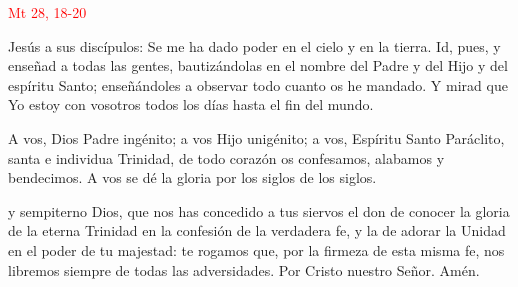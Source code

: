 \documentclass[10pt]{article}
\begin{document}
\begin{multicols}{2}
      \vspace{2mm}

      \hfill\textcolor{red}{Mt 28, 18-20}

      Jesús a sus discípulos: Se me ha dado poder en el cielo y en la tierra. Id, pues, y enseñad a todas las gentes, bautizándolas en el nombre del Padre y del Hijo y del espíritu
      Santo; enseñándoles a observar todo cuanto os he mandado. Y mirad que Yo estoy con vosotros todos los días hasta el fin del mundo.

      \vspace{2mm}

      \begin{otherlanguage}{latin}
            

            \vspace{1mm}

            

            \vspace{1mm}

            
      \end{otherlanguage}

      \vspace{2mm}

      A vos, Dios Padre ingénito; a vos Hijo unigénito; a vos, Espíritu Santo Paráclito, santa e individua Trinidad, de todo corazón os confesamos, alabamos y bendecimos. A vos se dé
      la gloria por los siglos de los siglos.

      \vspace{2mm}


      \vspace{2mm}

      y sempiterno Dios, que nos has concedido a tus siervos el don de conocer la gloria de la eterna Trinidad en la confesión de la verdadera fe,
      y la de adorar la Unidad en el poder de tu majestad: te rogamos que, por la firmeza de esta misma fe, nos libremos siempre de todas las adversidades. Por Cristo nuestro Señor.
      Amén.

\end{multicols}
\end{document}
